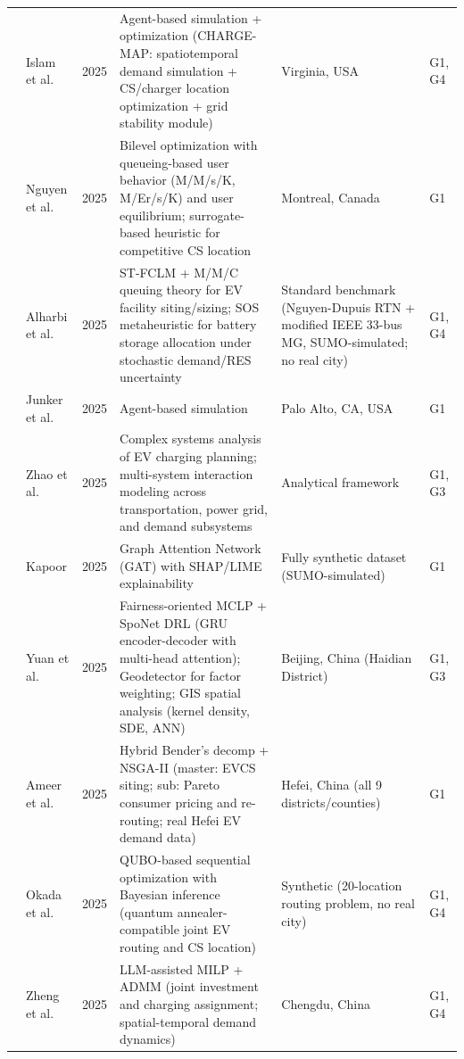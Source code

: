 \documentclass[letterpaper, 12pt, oneside, doublespacing]{Thesis}
\begin{document}
\begin{longtable}{L{0.9cm} L{2.2cm} L{0.8cm} L{3.3cm} L{2.5cm} L{1.5cm}}
\cite{charge-map_an_2025} & Islam et al. & 2025 & Agent-based simulation + optimization (CHARGE-MAP: spatiotemporal demand simulation + CS/charger location optimization + grid stability module) & Virginia, USA & G1, G4 \\
\cite{competitive_ev_2025} & Nguyen et al. & 2025 & Bilevel optimization with queueing-based user behavior (M/M/s/K, M/Er/s/K) and user equilibrium; surrogate-based heuristic for competitive CS location & Montreal, Canada & G1 \\
\cite{data-driven_ev_2025} & Alharbi et al. & 2025 & ST-FCLM + M/M/C queuing theory for EV facility siting/sizing; SOS metaheuristic for battery storage allocation under stochastic demand/RES uncertainty & Standard benchmark (Nguyen-Dupuis RTN + modified IEEE 33-bus MG, SUMO-simulated; no real city) & G1, G4 \\
\cite{data-driven_optimization_2025} & Junker et al. & 2025 & Agent-based simulation & Palo Alto, CA, USA & G1 \\
\cite{electric_vehicle_2025} & Zhao et al. & 2025 & Complex systems analysis of EV charging planning; multi-system interaction modeling across transportation, power grid, and demand subsystems & Analytical framework & G1, G3 \\
\cite{explainable_and_2025} & Kapoor & 2025 & Graph Attention Network (GAT) with SHAP/LIME explainability & Fully synthetic dataset (SUMO-simulated) & G1 \\
\cite{fairness-oriented_charging_2025} & Yuan et al. & 2025 & Fairness-oriented MCLP + SpoNet DRL (GRU encoder-decoder with multi-head attention); Geodetector for factor weighting; GIS spatial analysis (kernel density, SDE, ANN) & Beijing, China (Haidian District) & G1, G3 \\
\cite{hybrid_optimization_2025} & Ameer et al. & 2025 & Hybrid Bender's decomp + NSGA-II (master: EVCS siting; sub: Pareto consumer pricing and re-routing; real Hefei EV demand data) & Hefei, China (all 9 districts{\slash}counties) & G1 \\
\cite{joint_optimization_2025} & Okada et al. & 2025 & QUBO-based sequential optimization with Bayesian inference (quantum annealer-compatible joint EV routing and CS location) & Synthetic (20-location routing problem, no real city) & G1, G4 \\
\cite{large_language_2025} & Zheng et al. & 2025 & LLM-assisted MILP + ADMM (joint investment and charging assignment; spatial-temporal demand dynamics) & Chengdu, China & G1, G4 \\

\end{longtable}
\end{document}
